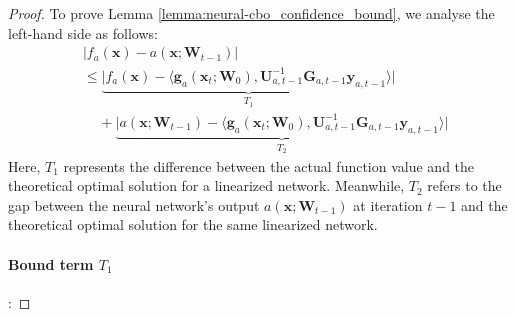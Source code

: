 \begin{proof}
To prove Lemma \ref{lemma:neural-cbo_confidence_bound}, we analyse the left-hand side as follows:
\begin{align*}
    & \lvert f_a(\mathbf{x}) - a(\mathbf{x}; \mathbf{W}_{t-1}) \rvert 
    \\
    & \le \underbrace{\lvert f_a(\mathbf{x}) - \langle \mathbf{g}_a(\mathbf{x}_{t};\mathbf{W}_{0}),\mathbf{U}_{a,t-1}^{-1}\mathbf{G}_{a,t-1}\mathbf{y}_{a,t-1} \rangle  \rvert}_{T_1} \\
    & \;\;\; \; + \underbrace{\lvert a(\mathbf{x}; \mathbf{W}_{t-1}) - \langle \mathbf{g}_a(\mathbf{x}_{t};\mathbf{W}_{0}),\mathbf{U}_{a,t-1}^{-1}\mathbf{G}_{a,t-1}\mathbf{y}_{a,t-1} \rangle  \rvert}_{T_2}
\end{align*}
Here, $T_1$ represents the difference between the actual function value and the theoretical optimal solution for a linearized network. Meanwhile, $T_2$ refers to the gap between the neural network's output $a(\mathbf{x}; \boldsymbol{W}_{t-1})$ at iteration $t-1$ and the theoretical optimal solution for the same linearized network.
\paragraph{Bound term $T_1$}:


\end{proof}
